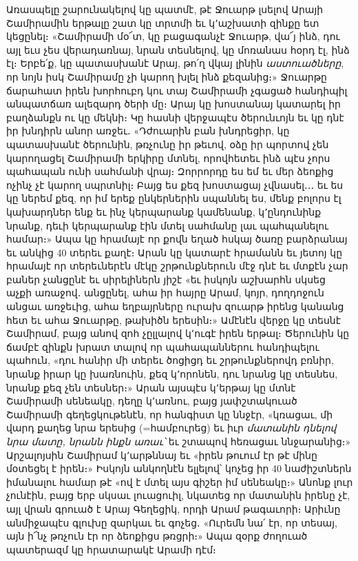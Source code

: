 \documentclass{article}
\begin{document}
{Առասպելը շարունակելով կը պատմէ, թէ Ջուարթ լսելով Արայի Շամիրամին երթալը շատ կը տրտմի եւ կ՚աշխատի զինքը ետ կեցընել։ «Շամիրամի մօ՜տ, կը բացագանչէ Ջուարթ, վա՜յ ինձ, դու այլ եւս չես վերադառնայ, նրան տեսնելով, կը մոռանաս հօրդ էլ, ինձ էլ։ Երբե՛ք, կը պատասխանէ Արայ, թո՛ղ վկայ լինին \emph{աստուածները}, որ նոյն իսկ Շամիրամը չի կարող խլել ինձ քեզանից։» Ջուարթը ճարահատ իրեն խորհուբդ կու տայ Շամիրամի չգացած հանդիպիլ անպատճառ ալեզարդ ծերի մը։ Արայ կը խոստանայ կատարել իր բաղձանքն ու կը մեկնի։ Կը հասնի վերջապէս ծերունւոյն եւ կը դնէ իր խնդիրն անոր առջեւ․ «Դժուարին բան խնդրեցիր, կը պատասխանէ ծերունին, թռչունը իր թեւով, օձը իր պորտով չեն կարողացել Շամիրամի երկիրը մտնել, որովհետեւ ինձ պէս չորս պահապան ունի սահմանի վրայ։ Զորրորդը ես եմ եւ մեր ձեոքից ոչինչ չէ կարող սպրտնիլ։ Բայց ես քեզ խոստացայ չվնասել․․․ եւ ես կը ներեմ քեզ, որ իմ երեք ընկերներին սպաննել ես, մենք բոլորս էլ կախարդներ ենք եւ ինչ կերպարանք կամենանք, կ՚ընդունինք նրանք, դեւի կերպարանք էին մտել սահմանը լաւ պահպանելու համար։» Ապա կը հրամայէ որ քովն եղած հսկայ ծառը բարձրանայ եւ անկից 40 տերեւ քաղէ։ Արան կը կատարէ հրամանն եւ յետոյ կը հրամայէ որ տերեւներէն մէկը շրթունքներուն մէջ դնէ եւ մտքէն չար բաներ չանցընէ եւ սիրելիներն յիշէ «եւ իսկոյն աշխարհն սկսեց աչքի առաջով․ անցընել, ահա իր հայրը Արամ, կոյր, դողդոջուն անցաւ առջեւից, ահա եղբայրները ուրախ զուարթ իրենց կանանց հետ եւ ահա Ջուարթը, թախիծն երեսին։» Ամէնէն վերջը կը տեսնէ Շամիրամ, բայց անով զոհ չըլլալով կ՚ուգէ իրեն երթալ։ Ծերունին կը ճամբէ զինքն խրատ տալով որ պահապաններու հանդիպելու պահուն, «դու հանիր մի տերեւ ծոցիցդ եւ շրթունքներովդ բռնիր, նրանք իրար կը խառնուին, քեզ կ՚որոնեն, դու նրանց կը տեսնես, նրանք քեզ չեն տեսներ։» Արան այսպէս կ՚երթայ կը մտնէ Շամիրամի սենեակը, դեղը կ՚առնու, բայց յափշտակուած Շամիրամի գեղեցկութենէն, որ հանգիստ կը ննջէր, «կռացաւ, մի վարդ քաղեց նրա երեսից (=համբուրեց) եւ իւր \emph{մատանին դնելով նրա մատը, նրանն ինքն առաւ՝} եւ շտապով հեռացաւ ննջարանից։» Արշալոյսին Շամիրամ կ՚արթննայ եւ «իրեն թուում էր թէ մինը մօտեցել է իրեն։» Իսկոյն անկողնէն ելլելով՝ կոչեց իր 40 նաժիշտներն իմանալու համար թէ «ով է մտել այս գիշեր իմ սենեակը։» Անոնք լուր չունէին, բայց երբ սկսաւ լուացուիլ, նկատեց որ մատանին իրենը չէ, այլ վրան գրուած է Արայ Գեղեցիկ, որդի Արամ թագաւորի։ Արիւնը անմիջապէս գլուխը զարկաւ եւ գոչեց․ «Ուրեմն նա՛ էր, որ տեսայ, այն ի՜նչ թռչուն էր որ ձեոքիցս թռցրի։» Ապա զօրք ժողուած պատերազմ կը հրատարակէ Արամի դէմ։

}
\end{document}
